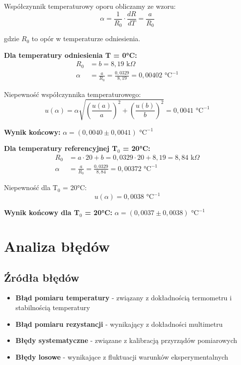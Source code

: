 \documentclass[11pt]{article}
\begin{document}
Współczynnik temperaturowy oporu obliczamy ze wzoru:
\begin{equation}
    \alpha = \frac{1}{R_0} \cdot \frac{dR}{dT} = \frac{a}{R_0}
\end{equation}

gdzie $R_0$ to opór w temperaturze odniesienia.

\textbf{Dla temperatury odniesienia T = 0°C:}
\begin{align}
    R_0 &= b = 8{,}19 \text{ k}\Omega \\
    \alpha &= \frac{a}{R_0} = \frac{0{,}0329}{8{,}19} = 0{,}00402 \text{ °C}^{-1}
\end{align}

Niepewność współczynnika temperaturowego:
\begin{equation}
    u(\alpha) = \alpha \sqrt{\left(\frac{u(a)}{a}\right)^2 + \left(\frac{u(b)}{b}\right)^2} = 0{,}0041 \text{ °C}^{-1}
\end{equation}

\textbf{Wynik końcowy:} $\alpha = (0{,}0040 \pm 0{,}0041) \text{ °C}^{-1}$

\textbf{Dla temperatury referencyjnej T$_0$ = 20°C:}
\begin{align}
    R_0 &= a \cdot 20 + b = 0{,}0329 \cdot 20 + 8{,}19 = 8{,}84 \text{ k}\Omega \\
    \alpha &= \frac{a}{R_0} = \frac{0{,}0329}{8{,}84} = 0{,}00372 \text{ °C}^{-1}
\end{align}

Niepewność dla T$_0$ = 20°C:
\begin{equation}
    u(\alpha) = 0{,}0038 \text{ °C}^{-1}
\end{equation}

\textbf{Wynik końcowy dla T$_0$ = 20°C:} $\alpha = (0{,}0037 \pm 0{,}0038) \text{ °C}^{-1}$



\section*{Analiza błędów}

\subsection*{Źródła błędów}
\begin{itemize}
    \item \textbf{Błąd pomiaru temperatury} - związany z dokładnością termometru i stabilnością temperatury
    \item \textbf{Błąd pomiaru rezystancji} - wynikający z dokładności multimetru
    \item \textbf{Błędy systematyczne} - związane z kalibracją przyrządów pomiarowych
    \item \textbf{Błędy losowe} - wynikające z fluktuacji warunków eksperymentalnych
\end{itemize}
\end{document}
